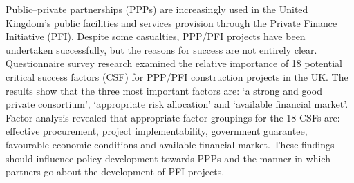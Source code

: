 Public–private partnerships (PPPs) are increasingly used in the United Kingdom's public facilities and services provision through the Private Finance Initiative (PFI). Despite some casualties, PPP/PFI 
projects have been undertaken successfully, but the reasons for success are not entirely clear. Questionnaire survey research examined the relative importance of 18 potential critical success factors (CSF) for PPP/PFI construction projects in the UK. The results show that the three most important factors are: ‘a strong and good private consortium’, ‘appropriate risk allocation’ and ‘available
financial market’. Factor analysis revealed that appropriate factor groupings for the 18 CSFs are: effective procurement, project implementability, government guarantee, favourable economic conditions and
available financial market. These findings should influence policy development towards PPPs and the manner in which partners go about the development of PFI projects.
